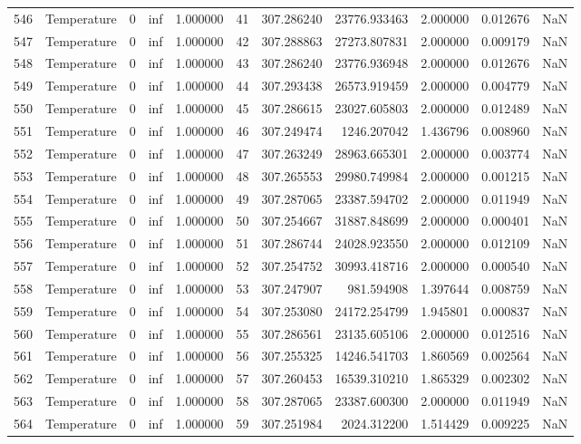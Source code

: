 \begin{tabular}{llrrrrrrrrr}
546 & Temperature & 0 & inf & 1.000000 & 41 & 307.286240 & 23776.933463 & 2.000000 & 0.012676 & NaN \\
547 & Temperature & 0 & inf & 1.000000 & 42 & 307.288863 & 27273.807831 & 2.000000 & 0.009179 & NaN \\
548 & Temperature & 0 & inf & 1.000000 & 43 & 307.286240 & 23776.936948 & 2.000000 & 0.012676 & NaN \\
549 & Temperature & 0 & inf & 1.000000 & 44 & 307.293438 & 26573.919459 & 2.000000 & 0.004779 & NaN \\
550 & Temperature & 0 & inf & 1.000000 & 45 & 307.286615 & 23027.605803 & 2.000000 & 0.012489 & NaN \\
551 & Temperature & 0 & inf & 1.000000 & 46 & 307.249474 & 1246.207042 & 1.436796 & 0.008960 & NaN \\
552 & Temperature & 0 & inf & 1.000000 & 47 & 307.263249 & 28963.665301 & 2.000000 & 0.003774 & NaN \\
553 & Temperature & 0 & inf & 1.000000 & 48 & 307.265553 & 29980.749984 & 2.000000 & 0.001215 & NaN \\
554 & Temperature & 0 & inf & 1.000000 & 49 & 307.287065 & 23387.594702 & 2.000000 & 0.011949 & NaN \\
555 & Temperature & 0 & inf & 1.000000 & 50 & 307.254667 & 31887.848699 & 2.000000 & 0.000401 & NaN \\
556 & Temperature & 0 & inf & 1.000000 & 51 & 307.286744 & 24028.923550 & 2.000000 & 0.012109 & NaN \\
557 & Temperature & 0 & inf & 1.000000 & 52 & 307.254752 & 30993.418716 & 2.000000 & 0.000540 & NaN \\
558 & Temperature & 0 & inf & 1.000000 & 53 & 307.247907 & 981.594908 & 1.397644 & 0.008759 & NaN \\
559 & Temperature & 0 & inf & 1.000000 & 54 & 307.253080 & 24172.254799 & 1.945801 & 0.000837 & NaN \\
560 & Temperature & 0 & inf & 1.000000 & 55 & 307.286561 & 23135.605106 & 2.000000 & 0.012516 & NaN \\
561 & Temperature & 0 & inf & 1.000000 & 56 & 307.255325 & 14246.541703 & 1.860569 & 0.002564 & NaN \\
562 & Temperature & 0 & inf & 1.000000 & 57 & 307.260453 & 16539.310210 & 1.865329 & 0.002302 & NaN \\
563 & Temperature & 0 & inf & 1.000000 & 58 & 307.287065 & 23387.600300 & 2.000000 & 0.011949 & NaN \\
564 & Temperature & 0 & inf & 1.000000 & 59 & 307.251984 & 2024.312200 & 1.514429 & 0.009225 & NaN \\

\end{tabular}
